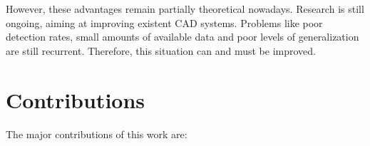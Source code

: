 However, these advantages remain partially theoretical nowadays. Research is still ongoing, aiming at improving existent CAD systems. Problems like poor detection rates, small amounts of available data and poor levels of generalization are still recurrent. Therefore, this situation can and must be improved.




\section{Contributions}
\setlength{\marginparwidth}{3cm}\leavevmode {}%
The major contributions of this work are:
